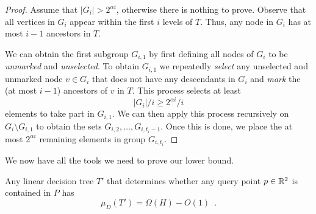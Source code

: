 \documentclass[charterfonts,lotsofwhite]{patmorin}
\begin{document}
\begin{proof}
Assume that $|G_i|> 2^{\alpha i}$, otherwise there is nothing to
prove.  Observe that all vertices in $G_i$ appear within the first $i$
levels of $T$.  Thus, any node in $G_i$ has at most $i-1$ ancestors in
$T$.  

We can obtain the first subgroup $G_{i,1}$ by first defining all nodes of
$G_i$ to be \emph{unmarked} and \emph{unselected}.  To obtain
$G_{i,1}$ we repeatedly \emph{select} any unselected and unmarked
node $v\in G_i$ that does not have any descendants in $G_i$ and
\emph{mark} the (at most $i-1$) ancestors of $v$ in $T$.  This
process selects at least
\[
   |G_i|/i \ge 2^{\alpha i}/i
\] 
elements to take part in $G_{i,1}$.  We can then apply this process
recursively on $G_i\setminus G_{i,1}$ to obtain the sets
$G_{i,2},\ldots,G_{i,t_i-1}$.  Once this is done, we place the at most
$2^{\alpha i}$ remaining elements in group $G_{i,t_i}$.
\end{proof}

We now have all the tools we need to prove our lower bound.

\begin{thm}
Any linear decision tree $T'$ that determines whether any query point 
$p\in\mathbb{R}^2$ is contained in $P$ has
\[
   \mu_D(T') = \Omega(H) - O(1) \enspace .
\]
\end{thm}
\end{document}
